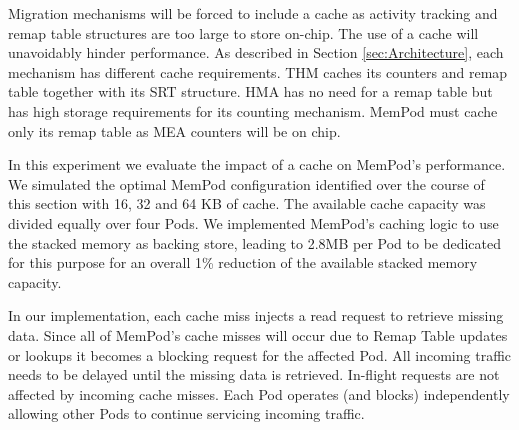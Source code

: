 Migration mechanisms will be forced to include a cache as activity tracking and remap table structures are too large to store on-chip. The use of a cache will unavoidably hinder performance. As described in Section \ref{sec:Architecture}, each mechanism has different cache requirements. THM caches its counters and remap table together with its SRT structure. HMA has no need for a remap table but has high storage requirements for its counting mechanism. MemPod must cache only its remap table as MEA counters will be on chip. 

In this experiment we evaluate the impact of a cache on MemPod's performance. We simulated the optimal MemPod configuration identified over the course of this section with 16, 32 and 64 KB of cache. The available cache capacity was divided equally over four Pods. We implemented MemPod's caching logic to use the stacked memory as backing store, leading to 2.8MB per Pod to be dedicated for this purpose for an overall 1\% reduction of the available stacked memory capacity.

In our implementation, each cache miss injects a read request to retrieve missing data. Since all of MemPod's cache misses will occur due to Remap Table updates or lookups it becomes a blocking request for the affected Pod. All incoming traffic needs to be delayed until the missing data is retrieved. In-flight requests are not affected by incoming cache misses. Each Pod operates (and blocks) independently allowing other Pods to continue servicing incoming traffic.

